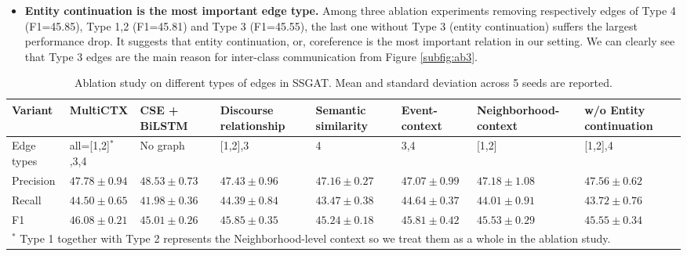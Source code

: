 \begin{itemize}
    
    \item \textbf{Entity continuation is the most important edge type.} Among three ablation experiments removing respectively edges of Type 4 (F1=45.85), Type 1,2 (F1=45.81) and Type 3 (F1=45.55), the last one without Type 3 (entity continuation) suffers the largest performance drop. It suggests that entity continuation, or, coreference is the most important relation in our setting.
    We can clearly see that Type 3 edges are the main reason for inter-class communication from Figure \ref{subfig:ab3}.

\end{itemize}



\begin{table}[htbp]
  \centering 
    \begin{tabular}{p{4em}p{6em}p{6em}p{6em}p{6em}p{6em}p{6em}p{6em}}
    \toprule
         \textbf{Variant} & \textbf{MultiCTX} & \textbf{CSE + BiLSTM} & \textbf{Discourse relationship } & \textbf{Semantic similarity} & \textbf{Event-context} & \textbf{Neighborhood-context}  &  \textbf{w/o Entity continuation} \\\midrule
       Edge types &  all=[1,2]$^{*}$,3,4  & No graph & [1,2],3 & 4  & 3,4 &  [1,2] & [1,2],4\\\hline
    Precision &    $47.78 \pm 0.94$   &  $48.53 \pm 0.73$ &  $47.43 \pm 0.96$ &    $47.16 \pm 0.27$   &  $47.07\pm 0.99$ &  $47.18 \pm 1.08$     &  $47.56 \pm 0.62$       \\
    \hline
    Recall &   $44.50 \pm 0.65$    &   $41.98\pm 0.36$  & $44.39\pm 0.84$  &    $43.47\pm 0.38$ & $44.64\pm 0.37$  & $44.01\pm 0.91$  &      $43.72\pm 0.76$   \\
    \hline
    F1    &  $46.08\pm0.21$  & $45.01 \pm 0.26 $  &   $45.85\pm0.35$    &  $45.24\pm0.18$        & $45.81\pm0.42 $     & $45.53\pm0.29$   &  $45.55\pm0.34$\\
    \bottomrule
    \multicolumn{8}{l}{$^{*}$  Type 1 together with Type 2 represents the Neighborhood-level context so we treat them as a whole in the ablation study.} \\
    \end{tabular}%
      \caption{Ablation study on different types of edges in SSGAT. Mean and standard deviation across 5 seeds are reported.}
  \label{tab:ablation}%
\end{table}%

